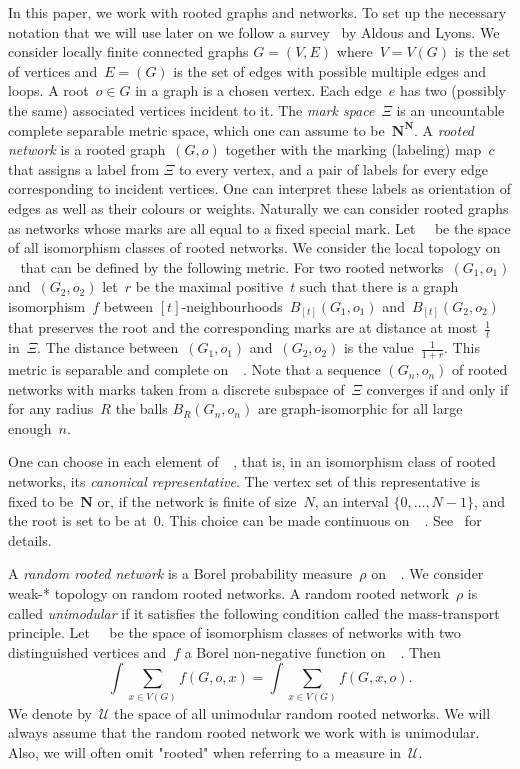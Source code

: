 \documentclass[english]{article}
\theoremstyle{definition}
\DeclareMathOperator{\Gr}{{\mathcal{G}_*}}
\DeclareMathOperator{\Grr}{{\mathcal{G}_{**}}}
\newcommand*{\field}[1]{\mathbf{#1}} %
\newcommand*\N{\field{N}} %
\newcommand*\Un{\mathcal{U}} %
\begin{document}
In this paper, we work with rooted graphs and networks. To set up the necessary notation that we will use later on we follow a survey~\cite{AL07} by Aldous and Lyons. We consider locally finite connected graphs $G = (V,E)$ where~$V = V(G)$ is the set of vertices and~$E = (G)$ is the set of edges with possible multiple edges and loops. A root~$o \in G$ in a graph is a chosen vertex. Each edge~$e$ has two (possibly the same) associated vertices incident to it. The \emph{mark space}~$\Xi$ is an uncountable complete separable metric space, which one can assume to be~$\N^\N$. A \emph{rooted network} is a rooted graph~$(G,o)$ together with the marking (labeling) map~$c$ that assigns a label from $\Xi$ to every vertex, and a pair of labels for every edge corresponding to incident vertices. One can interpret these labels as orientation of edges as well as their colours or weights. Naturally we can consider rooted graphs as networks whose marks are all equal to a fixed special mark. Let~$\Gr$ be the space of all isomorphism classes of rooted networks. We consider the local topology on~$\Gr$ that can be defined by the following metric. For two rooted networks~$(G_1,o_1)$ and~$(G_2, o_2)$ let~$r$ be the maximal positive~$t$ such that there is a graph isomorphism~$f$ between $[t]$-neighbourhoods~$B_{[t]}(G_1,o_1)$ and~$B_{[t]}(G_2,o_2)$ that preserves the root and the corresponding marks are at distance at most~$\frac{1}{t}$ in~$\Xi$. The distance between~$(G_1,o_1)$ and~$(G_2, o_2)$ is the value~$\frac{1}{1 + r}$. This metric is separable and complete on~$\Gr$.
Note that a sequence $(G_n, o_n)$ of rooted networks with marks taken from a discrete subspace of~$\Xi$ converges if and only if for any radius~$R$ the balls $B_R(G_n,o_n)$ are graph-isomorphic for all large enough~$n$.  

One can choose in each element of~$\Gr$, that is, in an isomorphism class of rooted networks, its \emph{canonical representative}. The vertex set of this representative is fixed to be~$\N$ or, if the network is finite of size~$N$, an interval $\{0, \ldots, N -1\}$, and the root is set to be at~$0$. This choice can be made continuous on~$\Gr$. See~\cite{AL07} for details. 


A \emph{random rooted network} is a Borel probability measure~$\rho$ on~$\Gr$. We consider weak-* topology on random rooted networks. A random rooted network~$\rho$ is called \emph{unimodular} if it satisfies the following condition called the mass-transport principle. Let~$\Grr$ be the space of isomorphism classes of networks with two distinguished vertices and~$f$ a Borel non-negative function on~$\Grr$. Then
\begin{equation}\label{eq_mass_transport}
    \int\limits_{\Gr} \sum_{x \in V(G)} f(G,o, x) =  \int\limits_{\Gr} \sum_{x \in V(G)} f(G, x, o).
\end{equation}
We denote by~$\Un$ the space of all unimodular random rooted networks. We will always assume that the random rooted network we work with is unimodular. Also, we will often omit "rooted" when referring to a measure in~$\Un$.
\end{document}
